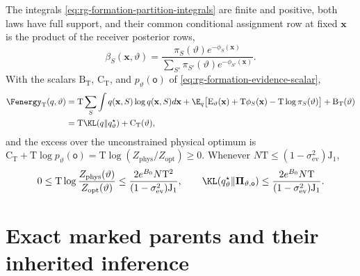The integrals \cref{eq:rg-formation-partition-integrals} are finite and
positive, both laws have full support, and their common conditional
assignment row at fixed \(\mathbf x\) is the product of the receiver posterior
rows,
\begin{equation}
\beta_S(\mathbf x,\vartheta)=
\frac{\pi_S(\vartheta)e^{-\phi_S(\mathbf x)}}
     {\sum_{S'}\pi_{S'}(\vartheta)e^{-\phi_{S'}(\mathbf x)}}.
\label{eq:rg-formation-full-source-row}
\end{equation}
With the scalars \(\mathrm B_{\mathrm T}\), \(\mathrm C_{\mathrm T}\), and
\(p_\vartheta(\mathsf o)\) of \cref{eq:rg-formation-evidence-scalar},
\begin{equation}
\begin{aligned}
\Fenergy_{\mathrm T}(q,\vartheta)
 &=\mathrm T\sum_S\int q(\mathbf x,S)\log q(\mathbf x,S) d\mathbf x
  +\E_q\bigl[\mathrm E_\vartheta(\mathbf x)+\mathrm T\phi_S(\mathbf x)
       -\mathrm T\log\pi_S(\vartheta)\bigr]
       +\mathrm B_{\mathrm T}(\vartheta)\\
 &=\mathrm T\KL(q\Vert q^\star_\vartheta)+\mathrm C_{\mathrm T}(\vartheta),
\end{aligned}
\label{eq:rg-formation-restricted-vfe}
\end{equation}
and the excess over the unconstrained physical optimum is
\(\mathrm C_{\mathrm T}+\mathrm T\log p_\vartheta(\mathsf o)
=\mathrm T\log(Z_{\mathrm{phys}}/Z_{\mathrm{opt}})\ge0\). Whenever
\(N\mathrm T\le(1-\sigma^2_{\mathrm{ev}})\mathrm J_1\),
\begin{equation}
0\le\mathrm T\log\frac{Z_{\mathrm{phys}}(\vartheta)}{Z_{\mathrm{opt}}(\vartheta)}
\le\frac{2e^{B_0}N\mathrm T^2}{(1-\sigma^2_{\mathrm{ev}})\mathrm J_1},
\qquad
\KL(q^\star_\vartheta\Vert\boldsymbol\Pi_{\vartheta,\mathsf o})
\le\frac{2e^{B_0}N\mathrm T}{(1-\sigma^2_{\mathrm{ev}})\mathrm J_1}.
\label{eq:rg-formation-physical-optimizer-gap}
\end{equation}

\section{Exact marked parents and their inherited inference}
\label{sec:rg-formation-parents}

